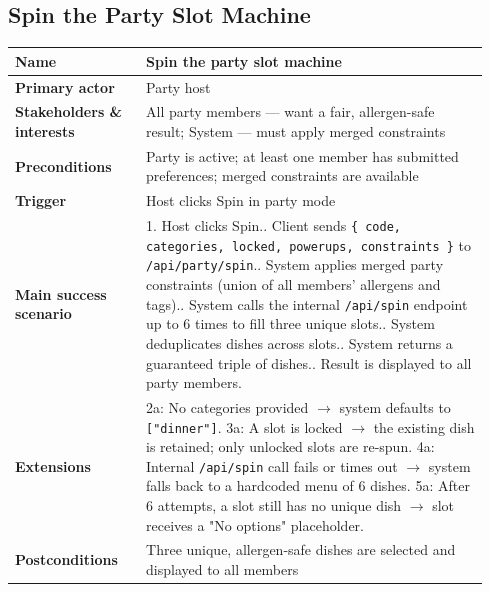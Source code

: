 \documentclass[sigconf]{acmart}
\begin{document}
\subsection*{Spin the Party Slot Machine}
{\footnotesize
\begin{supertabular}{@{}p{0.26\linewidth}p{0.68\linewidth}@{}}
\textbf{Name} & Spin the party slot machine \\
\hline
\textbf{Primary actor} & Party host \\
\hline
\textbf{Stakeholders \& interests} & All party members --- want a fair, allergen-safe result; System --- must apply merged constraints \\
\hline
\textbf{Preconditions} & Party is active; at least one member has submitted preferences; merged constraints are available \\
\hline
\textbf{Trigger} & Host clicks Spin in party mode \\
\hline
\textbf{Main success scenario} & 1. Host clicks Spin.. Client sends \texttt{\{ code, categories, locked, powerups, constraints \}} to \texttt{/api/party/spin}.. System applies merged party constraints (union of all members' allergens and tags).. System calls the internal \texttt{/api/spin} endpoint up to 6 times to fill three unique slots.. System deduplicates dishes across slots.. System returns a guaranteed triple of dishes.. Result is displayed to all party members. \\
\hline
\textbf{Extensions} & 2a: No categories provided $\rightarrow$ system defaults to \texttt{["dinner"]}.\newline
3a: A slot is locked $\rightarrow$ the existing dish is retained; only unlocked slots are re-spun.\newline
4a: Internal \texttt{/api/spin} call fails or times out $\rightarrow$ system falls back to a hardcoded menu of 6 dishes.\newline
5a: After 6 attempts, a slot still has no unique dish $\rightarrow$ slot receives a "No options" placeholder. \\
\hline
\textbf{Postconditions} & Three unique, allergen-safe dishes are selected and displayed to all members \\
\end{supertabular}
}
\end{document}
